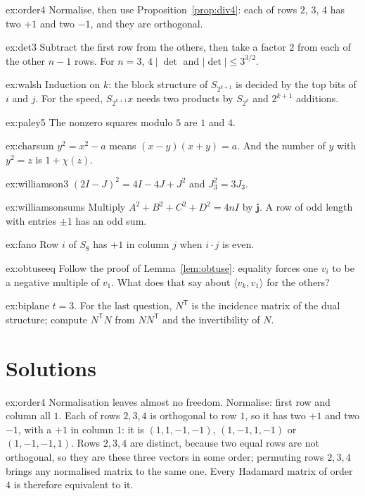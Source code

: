 \begin{hint}{ex:order4}
Normalise, then use Proposition~\ref{prop:div4}: each of rows $2$, $3$, $4$ has two $+1$ and two $-1$, and they are orthogonal.
\end{hint}
\begin{hint}{ex:det3}
Subtract the first row from the others, then take a factor $2$ from each of the other $n-1$ rows. For $n=3$, $4\mid\det$ and $|\det|\le3^{3/2}$.
\end{hint}
\begin{hint}{ex:walsh}
Induction on $k$: the block structure of $S_{2^{k+1}}$ is decided by the top bits of $i$ and $j$. For the speed, $S_{2^{k+1}}x$ needs two products by
$S_{2^k}$ and $2^{k+1}$ additions.
\end{hint}
\begin{hint}{ex:paley5}
The nonzero squares modulo $5$ are $1$ and $4$.
\end{hint}
\begin{hint}{ex:charsum}
$y^2=x^2-a$ means $(x-y)(x+y)=a$. And the number of $y$ with $y^2=z$ is $1+\chi(z)$.
\end{hint}
\begin{hint}{ex:williamson3}
$(2I-J)^2=4I-4J+J^2$ and $J_3^2=3J_3$.
\end{hint}
\begin{hint}{ex:williamsonsums}
Multiply $A^2+B^2+C^2+D^2=4nI$ by $\mathbf j$. A row of odd length with entries $\pm1$ has an odd sum.
\end{hint}
\begin{hint}{ex:fano}
Row $i$ of $S_8$ has $+1$ in column $j$ when $i\cdot j$ is even.
\end{hint}
\begin{hint}{ex:obtuseeq}
Follow the proof of Lemma~\ref{lem:obtuse}: equality forces one $v_i$ to be a negative multiple of $v_1$. What does that say about $\langle v_k,v_1\rangle$
for the others?
\end{hint}
\begin{hint}{ex:biplane}
$t=3$. For the last question, $N^{\mathsf T}$ is the incidence matrix of the dual structure; compute $N^{\mathsf T}N$ from $NN^{\mathsf T}$ and the
invertibility of $N$.
\end{hint}

\section{Solutions}

\begin{solution}{ex:order4}
\idea Normalisation leaves almost no freedom.
\writeup Normalise: first row and column all $1$. Each of rows $2,3,4$ is orthogonal to row $1$, so it has two $+1$ and two $-1$, with a $+1$ in column
$1$: it is $(1,1,-1,-1)$, $(1,-1,1,-1)$ or $(1,-1,-1,1)$. Rows $2,3,4$ are distinct, because two equal rows are not orthogonal, so they are these three
vectors in some order; permuting rows $2,3,4$ brings any normalised matrix to the same one. Every Hadamard matrix of order $4$ is therefore equivalent to
it.
\end{solution}

